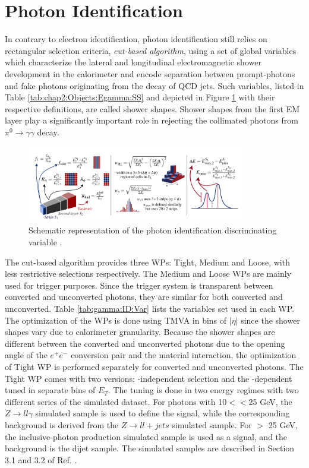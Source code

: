 \section{Photon Identification}
\label{gamma:ID}
In contrary to electron identification, photon identification still relies on rectangular selection criteria, \emph{cut-based algorithm}, using a set of global variables which characterize the lateral and longitudinal electromagnetic shower development in the calorimeter and encode separation between prompt-photons and fake photons originating from the decay of QCD jets. Such variables, listed in Table \ref{tab:chap2:Objects:Egamma:SS} and depicted in Figure \ref{fig:gamma:ID:SS} with their respective definitions, are called shower shapes. Shower shapes from the first EM layer play a significantly important role in rejecting the collimated photons from $\pi^{0} \rightarrow\gamma\gamma$ decay. \\ 
\begin{figure}[htbp]
    \centering
    \includegraphics[width=0.85\textwidth]{Ch3/Img/ShowerShapes.png}
    \caption{Schematic representation of the photon identification discriminating variable \cite{ShowerShapes_fig}.}
    \label{fig:gamma:ID:SS}
\end{figure}
The cut-based algorithm provides three WPs: Tight, Medium and Loose, with less restrictive selections respectively. The Medium and Loose WPs are mainly used for trigger purposes. Since the trigger system is transparent between converted and unconverted photons, they are similar for both converted and unconverted. Table \ref{tab:gamma:ID:Var} lists the variables set used in each WP. The optimization of the WPs is done using TMVA \cite{TMVA} in bins of $|\eta|$ since the shower shapes vary due to calorimeter granularity. Because the shower shapes are different between the converted and unconverted photons due to the opening angle of the $e^+e^-$ conversion pair and the material interaction, the optimization of Tight WP is performed separately for converted and unconverted photons. The Tight WP comes with two versions: \eT-independent selection and the \eT-dependent tuned in separate bins of $E_T$. The tuning is done in two energy regimes with two different series of the simulated dataset. For photons with 10$<$\eT$<$25 GeV, the $Z\rightarrow ll\gamma$ simulated sample is used to define the signal, while the corresponding background is derived from the $Z\rightarrow ll+jets$ simulated sample. For \eT$>$ 25 GeV, the inclusive-photon production simulated sample is used as a signal, and the background is the dijet sample. The simulated samples are described in Section 3.1 and 3.2 of Ref. \cite{Egamma_Perf_2017}.   

